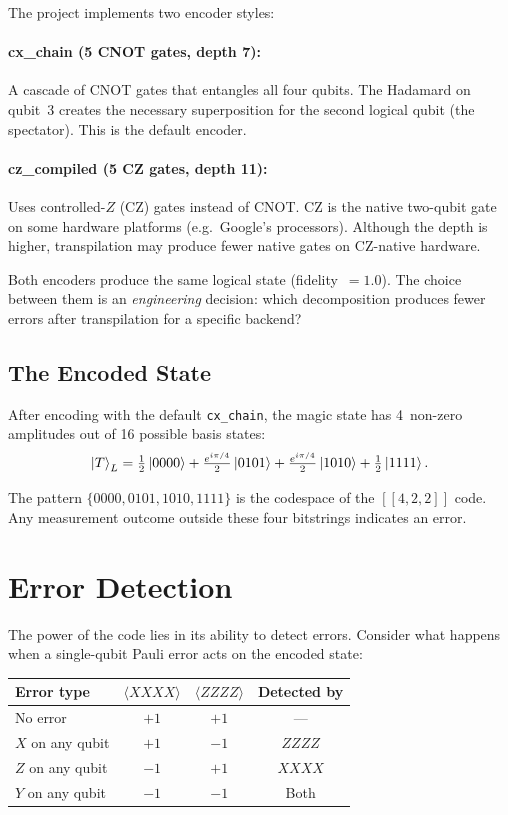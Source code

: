 \documentclass[11pt,a4paper,twoside]{report}
\theoremstyle{definition}
\newcommand{\expect}[1]{\langle #1 \rangle}
\newcommand{\code}[1]{\texttt{#1}}
\begin{document}
The project implements two encoder styles:

\paragraph{cx\_chain (5 CNOT gates, depth 7):} A cascade of CNOT gates
that entangles all four qubits. The Hadamard on qubit~3 creates the
necessary superposition for the second logical qubit (the spectator).
This is the default encoder.

\paragraph{cz\_compiled (5 CZ gates, depth 11):} Uses controlled-$Z$
(CZ) gates instead of CNOT. CZ is the native two-qubit gate on some
hardware platforms (e.g.\ Google's processors). Although the depth is
higher, transpilation may produce fewer native gates on CZ-native
hardware.

Both encoders produce the same logical state (fidelity~$= 1.0$).
The choice between them is an \emph{engineering} decision: which
decomposition produces fewer errors after transpilation for a specific
backend?

\subsection{The Encoded State}

After encoding with the default \code{cx\_chain}, the magic state has
4~non-zero amplitudes out of 16 possible basis states:
\begin{equation}
  \ket{T}_L = \tfrac{1}{2}\ket{0000}
  + \tfrac{e^{i\pi/4}}{2}\ket{0101}
  + \tfrac{e^{i\pi/4}}{2}\ket{1010}
  + \tfrac{1}{2}\ket{1111}.
\end{equation}

The pattern $\{0000, 0101, 1010, 1111\}$ is the codespace of the
$[\![4,2,2]\!]$ code. Any measurement outcome outside these four
bitstrings indicates an error.

\section{Error Detection}
\label{sec:errors}

The power of the code lies in its ability to detect errors. Consider
what happens when a single-qubit Pauli error acts on the encoded state:

\begin{center}
\renewcommand{\arraystretch}{1.3}
\begin{tabular}{lccc}
\toprule
\textbf{Error type} & $\expect{XXXX}$ & $\expect{ZZZZ}$ &
\textbf{Detected by} \\
\midrule
No error & $+1$ & $+1$ & --- \\
$X$ on any qubit & $+1$ & $-1$ & $ZZZZ$ \\
$Z$ on any qubit & $-1$ & $+1$ & $XXXX$ \\
$Y$ on any qubit & $-1$ & $-1$ & Both \\
\bottomrule
\end{tabular}
\end{center}
\end{document}
